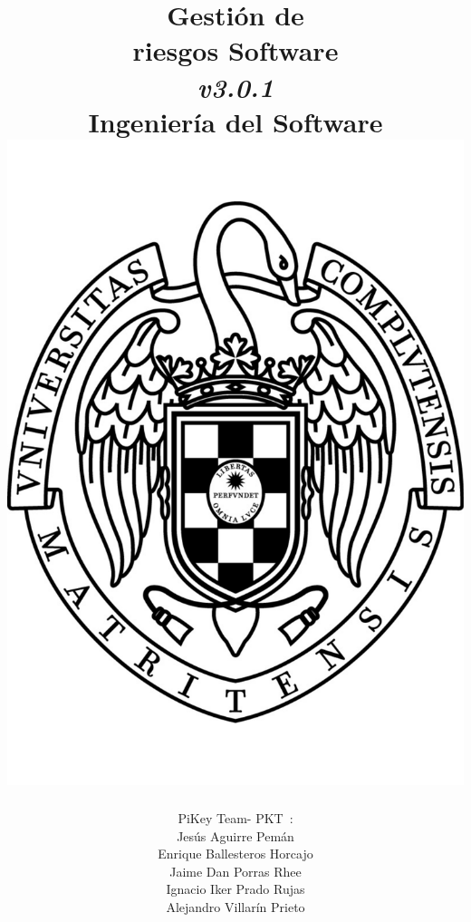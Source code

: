 \documentclass[spanish,a4paper,11pt, twoside]{report}	%
\newcommand*{\PKT}{\hbox{P}\kern-2.5pt\lower3.5pt\hbox{\small{K}}\kern-2.8pt\hbox{T}\kern-2pt}	%
\begin{document}
\title{\textbf{\huge{Gestión de \\ 
	riesgos Software}} \\ 
	\textit{v3.0.1} \\	\vspace{0.1cm}
	\Large{Ingeniería del Software} \\
	\includegraphics[scale=0.3]{ucm.pdf}}
\author{{\Large{PiKey Team-}} \PKT \ : \vspace{0.2cm} \\
	Jesús Aguirre Pemán \\
	 Enrique Ballesteros Horcajo \\
	 Jaime Dan Porras Rhee \\
	 Ignacio Iker Prado Rujas \\
	 Alejandro Villarín Prieto }
\date{\Today}
\maketitle
\end{document}
